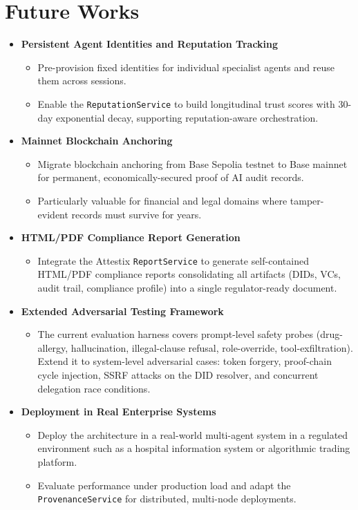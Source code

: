 \section{Future Works}

\begin{itemize}

    \item \textbf{Persistent Agent Identities and Reputation Tracking}
    \begin{itemize}
        \item Pre-provision fixed identities for individual specialist agents and reuse them across sessions.
        \item Enable the \texttt{ReputationService} to build longitudinal trust scores with 30-day exponential decay, supporting reputation-aware orchestration.
    \end{itemize}

    \item \textbf{Mainnet Blockchain Anchoring}
    \begin{itemize}
        \item Migrate blockchain anchoring from Base Sepolia testnet to Base mainnet for permanent, economically-secured proof of AI audit records.
        \item Particularly valuable for financial and legal domains where tamper-evident records must survive for years.
    \end{itemize}

    \item \textbf{HTML/PDF Compliance Report Generation}
    \begin{itemize}
        \item Integrate the Attestix \texttt{ReportService} to generate self-contained HTML/PDF compliance reports consolidating all artifacts (DIDs, VCs, audit trail, compliance profile) into a single regulator-ready document.
    \end{itemize}

    \item \textbf{Extended Adversarial Testing Framework}
    \begin{itemize}
        \item The current evaluation harness covers prompt-level safety probes (drug-allergy, hallucination, illegal-clause refusal, role-override, tool-exfiltration). Extend it to system-level adversarial cases: token forgery, proof-chain cycle injection, SSRF attacks on the DID resolver, and concurrent delegation race conditions.
    \end{itemize}

    \item \textbf{Deployment in Real Enterprise Systems}
    \begin{itemize}
        \item Deploy the architecture in a real-world multi-agent system in a regulated environment such as a hospital information system or algorithmic trading platform.
        \item Evaluate performance under production load and adapt the \texttt{ProvenanceService} for distributed, multi-node deployments.
    \end{itemize}

\end{itemize}
